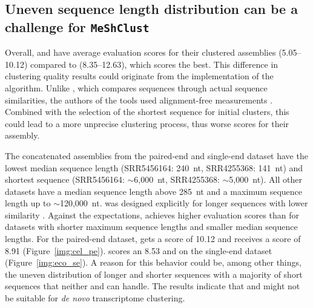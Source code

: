 \documentclass[12pt,a4paper,english]{article}
\begin{document}
	\subsection{Uneven sequence length distribution can be a challenge for \texttt{MeShClust}}
		Overall, \mclust and \mclusttwo have average evaluation scores for their clustered assemblies (5.05--10.12) compared to \cdhit (8.35--12.63), which scores the best. This difference in clustering quality results could originate from the implementation of the \mclust algorithm. Unlike \cdhit, which compares sequences through actual sequence similarities, the authors of the tools used alignment-free measurements \citep{meshclust:18}. Combined with the selection of the shortest sequence for initial clusters, this could lead to a more unprecise clustering process, thus worse scores for their assembly.
	
	    The concatenated assemblies from the paired-end \celegans and single-end \ecoli dataset have the lowest median sequence length (SRR5456164: 240~nt, SRR4255368: 141~nt) and shortest sequence (SRR5456164: $\sim$6,000~nt, SRR4255368: $\sim$5,000~nt). All other datasets have a median sequence length above 285~nt and a maximum sequence length up to $\sim$120,000~nt.
		\mclusttwo was designed explicitly for longer sequences with lower similarity \citep{meshclust2:18}. Against the expectations, \mclusttwo achieves higher evaluation scores than \mclust for datasets with shorter maximum sequence lengths and smaller median sequence lengths.
		For the paired-end \celegans dataset, \mclusttwo gets a score of 10.12 and \mclust receives a score of 8.91 (Figure~\ref{img:cel_pe}). \mclusttwo scores an 8.53 and  on the single-end \ecoli dataset (Figure~\ref{img:eco_se}).
		A reason for this behavior could be, among other things, the uneven distribution of longer and shorter sequences with a majority of short sequences that neither \mclust and \mclusttwo can handle.
		The results indicate that \mclust and \mclusttwo might not be suitable for \textit{de novo} transcriptome clustering.
	
\end{document}
